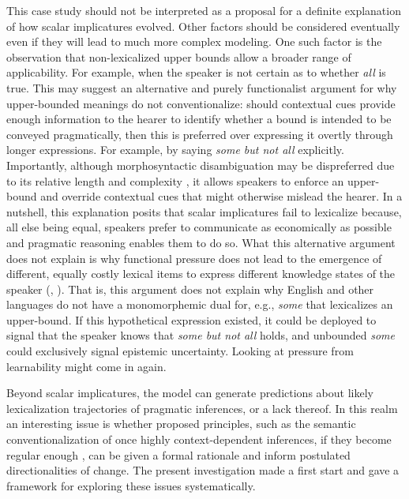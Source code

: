 \documentclass[a4paper, 11pt]{article}
\theoremstyle{Satz}
\begin{document}
This case study should not be interpreted as a proposal for a definite explanation of how
scalar implicatures evolved. Other factors should be considered eventually even if they will
lead to much more complex modeling. One such factor is the observation that non-lexicalized
upper bounds allow a broader range of applicability. For example, when the speaker is not
certain as to whether \emph{all} is true. This may suggest an alternative and purely
functionalist argument for why upper-bounded meanings do not conventionalize: should contextual
cues provide enough information to the hearer to identify whether a bound is intended to be
conveyed pragmatically, then this is preferred over expressing it overtly through longer
expressions. For example, by saying {\em some but not all} explicitly. Importantly, although
morphosyntactic disambiguation may be dispreferred due to its relative length and complexity
\citep{piantadosi+etal:2012b}, it allows speakers to enforce an upper-bound and override
contextual cues that might otherwise mislead the hearer. In a nutshell, this explanation posits
that scalar implicatures fail to lexicalize because, all else being equal, speakers prefer to
communicate as economically as possible and pragmatic reasoning enables them to do so. What
this alternative argument does not explain is why functional pressure does not lead to the
emergence of different, equally costly lexical items to express different knowledge states of
the speaker (\citealt[252-267]{horn:1984},
\citealt{horn:1972,traugott:2004,vdAuwera:2010}). That is, this argument does not explain why
English and other languages do not have a monomorphemic dual for, e.g., {\em some} that
lexicalizes an upper-bound. If this hypothetical expression existed, it could be deployed to
signal that the speaker knows that {\em some but not all} holds, and unbounded {\em some} could
exclusively signal epistemic uncertainty. Looking at pressure from learnability might come in
again.

Beyond scalar implicatures, the model can generate predictions about likely lexicalization
trajectories of pragmatic inferences, or a lack thereof. In this realm an interesting issue is
whether proposed principles, such as the semantic conventionalization of once highly
context-dependent inferences, if they become regular enough
\citep{levinson:2000,traugott:2004}, can be given a formal rationale and inform postulated
directionalities of change. The present investigation made a first start and gave a framework
for exploring these issues systematically.
\end{document}
